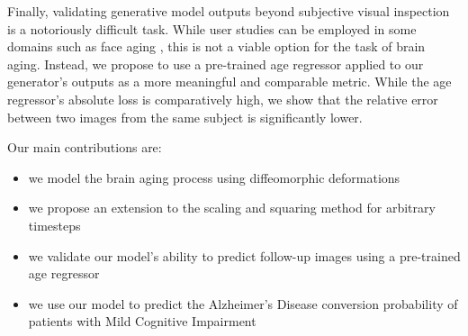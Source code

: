 Finally, validating generative model outputs beyond subjective visual inspection is a notoriously difficult task. While user studies can be employed in some domains such as face aging \cite{palsson2018generative}, this is not a viable option for the task of brain aging. Instead, we propose to use a pre-trained age regressor applied to our generator's outputs as a more meaningful and comparable metric. While the age regressor's absolute loss is comparatively high, we show that the relative error between two images from the same subject is significantly lower.

Our main contributions are:

\begin{itemize}
	\item we model the brain aging process using diffeomorphic deformations%
	\item we propose an extension to the scaling and squaring method for arbitrary timesteps
	\item we validate our model's ability to predict follow-up images using a pre-trained age regressor
	\item we use our model to predict the Alzheimer's Disease conversion probability of patients with Mild Cognitive Impairment
\end{itemize}

